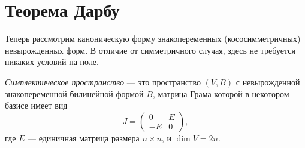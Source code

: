 \section{Теорема Дарбу}

Теперь рассмотрим каноническую форму знакопеременных (кососимметричных) невырожденных форм.
В отличие от симметричного случая, здесь не требуется никаких условий на поле.

\begin{definition}
    \emph{Симплектическое пространство} --- это пространство $(V, B)$ с невырожденной знакопеременной билинейной формой $B$,
    матрица Грама которой в некотором базисе имеет вид
    \[
        J = \begin{pmatrix} 0 & E \\ -E & 0 \end{pmatrix},
    \]
    где $E$ --- единичная матрица размера $n \times n$, и $\dim V = 2n$.
\end{definition}


